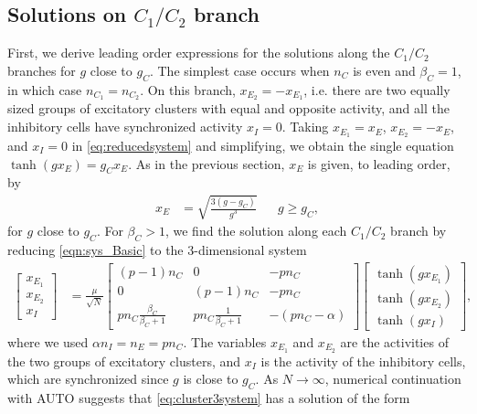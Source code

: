 \documentclass[reqno]{siamonline190516}
\begin{document}
\subsection{Solutions on \texorpdfstring{$C_1/C_2$}{C1/C2} branch}

First, we derive leading order expressions for the solutions along the $C_1/C_2$ branches for $g$ close to $g_C$. The simplest case occurs when $n_C$ is even and $\beta_C = 1$, in which case $n_{C_1}=n_{C_2}$. On this branch, $x_{E_2} = -x_{E_1}$, i.e. there are two equally sized groups of excitatory clusters with equal and opposite activity, and all the inhibitory cells have synchronized activity $x_I = 0$. Taking $x_{E_1} = x_E$, $x_{E_2} = -x_E$, and $x_I = 0$ in \cref{eq:reducedsystem} and simplifying, we obtain the single equation $\tanh(g x_E) = g_C x_E$. As in the previous section, $x_E$ is given, to leading order, by
\begin{align}\label{eq:xEapprox}
x_E &= \sqrt{ \frac{3(g - g_C) }{g^3}} && g \geq g_C,
\end{align}
for $g$ close to $g_C$. For $\beta_C > 1$, we find the solution along each $C_1/C_2$ branch by reducing \cref{eqn:sys_Basic} to the 3-dimensional system
\begin{equation}\label{eq:cluster3system}
 \begin{aligned}
 \begin{bmatrix} x_{E_1} \\ x_{E_2} \\ x_{I} \end{bmatrix} 
 &= \frac{\mu}{\sqrt{N}} 
 \begin{bmatrix} 
    (p-1)n_C & 0 & -p n_C  \\
    0  & (p-1)n_C & -p n_C \\
    p n_C \frac{\beta_C}{\beta_C+1} &
    p n_C \frac{1}{\beta_C+1} &
    -(p n_C - \alpha)
 \end{bmatrix}
 \begin{bmatrix} \tanh(g x_{E_1}) \\\tanh ( g x_{E_2} ) \\\tanh(g x_{I})\end{bmatrix},
 \end{aligned}
 \end{equation}
 where we used $\alpha n_I = n_E = p n_C$. The variables $x_{E_1}$ and $x_{E_2}$ are the activities of the two groups of excitatory clusters, and $x_I$ is the activity of the inhibitory cells, which are synchronized since $g$ is close to $g_C$. As $N \rightarrow \infty$, numerical continuation with AUTO suggests that \cref{eq:cluster3system} has a solution of the form
\end{document}
